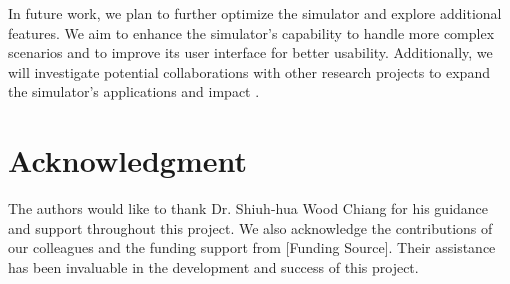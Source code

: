\documentclass[conference]{IEEEtran}
\begin{document}
In future work, we plan to further optimize the simulator and explore additional features. We aim to enhance the simulator's capability to handle more complex scenarios and to improve its user interface for better usability. Additionally, we will investigate potential collaborations with other research projects to expand the simulator's applications and impact \cite{Pepper1990}.

\section*{Acknowledgment}
The authors would like to thank Dr. Shiuh-hua Wood Chiang for his guidance and support throughout this project. We also acknowledge the contributions of our colleagues and the funding support from [Funding Source]. Their assistance has been invaluable in the development and success of this project.



\end{document}
